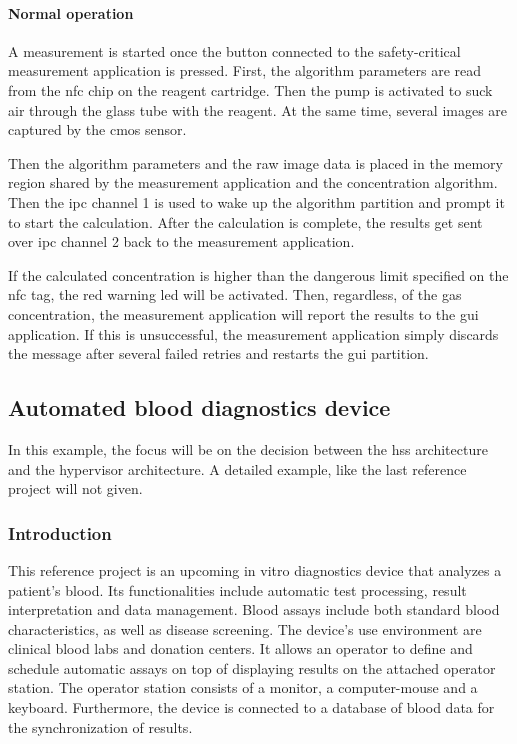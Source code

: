 \paragraph{Normal operation}
A measurement is started once the button connected to the safety-critical measurement application is pressed. First, the algorithm parameters are read from the \acrshort{nfc} chip on the reagent cartridge. Then the pump is activated to suck air through the glass tube with the reagent. At the same time, several images are captured by the \acrshort{cmos} sensor.

Then the algorithm parameters and the raw image data is placed in the memory region shared by the measurement application and the concentration algorithm. Then the \acrshort{ipc} channel 1 is used to wake up the algorithm partition and prompt it to start the calculation. After the calculation is complete, the results get sent over \acrshort{ipc} channel 2 back to the measurement application. 

If the calculated concentration is higher than the dangerous limit specified on the \acrshort{nfc} tag, the red warning \acrshort{led} will be activated. Then, regardless, of the gas concentration, the measurement application will report the results to the \acrshort{gui} application. If this is unsuccessful, the measurement application simply discards the message after several failed retries and restarts the \acrshort{gui} partition.

\subsection{Automated blood diagnostics device}
In this example, the focus will be on the decision between the \acrshort{hss} architecture and the hypervisor architecture. A detailed example, like the last reference project will not given.
\subsubsection{Introduction}
This reference project is an upcoming in vitro diagnostics device that analyzes a patient's blood. Its functionalities include automatic test processing, result interpretation and data management. Blood assays include both standard blood characteristics, as well as disease screening.
The device's use environment are clinical blood labs and donation centers. It allows an operator to define and schedule automatic assays on top of displaying results on the attached operator station. The operator station consists of a monitor, a computer-mouse and a keyboard. Furthermore, the device is connected to a database of blood data for the synchronization of results.

